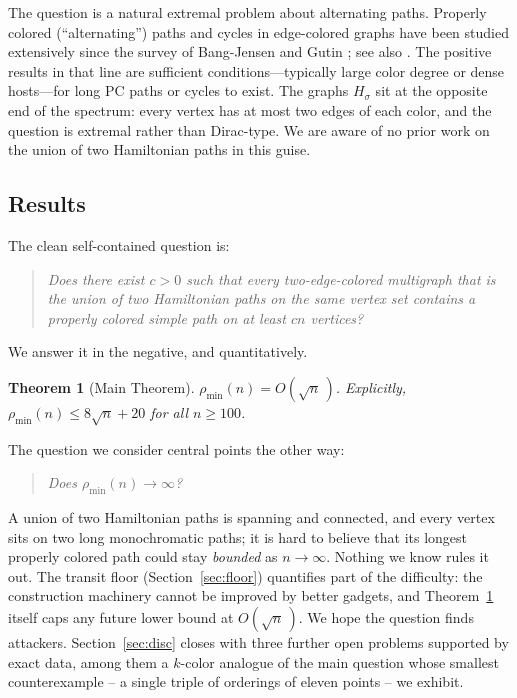 \documentclass[11pt]{article}
\newtheorem{theorem}{Theorem}[section]
\theoremstyle{definition}
\newcommand{\pmin}{\rho_{\min}}
\begin{document}
The question is a natural extremal problem about
alternating paths. Properly colored (``alternating'') paths and cycles in edge-colored
graphs have been studied extensively since the survey of Bang-Jensen and Gutin
\cite{BJG97}; see also \cite{GK09,ABMMM10}. The positive results in that line are
sufficient conditions---typically large color degree or dense hosts---for long PC paths
or cycles to exist. The graphs $H_\sigma$ sit at the opposite end of the spectrum:
every vertex has at most two edges of each color, and the question is extremal rather
than Dirac-type. We are aware of no prior work on the union of two Hamiltonian paths in
this guise.

\subsection{Results}

The clean self-contained question is:

\begin{quote}
\emph{Does there exist $c>0$ such that every two-edge-colored multigraph that is the
union of two Hamiltonian paths on the same vertex set contains a properly colored
simple path on at least $cn$ vertices?}
\end{quote}

We answer it in the negative, and quantitatively.

\begin{theorem}[Main Theorem]\label{thm:main-intro}
$\pmin(n) = O(\sqrt n\,)$. Explicitly, $\pmin(n) \le 8\sqrt n + 20$ for all
$n \ge 100$.
\end{theorem}

The question we consider central points the other way:

\begin{quote}
\emph{Does $\pmin(n) \to \infty$?}
\end{quote}

A union of two Hamiltonian paths is spanning and connected, and every vertex sits on
two long monochromatic paths; it is hard to believe that its longest properly colored
path could stay \emph{bounded} as $n \to \infty$. Nothing we know rules it out.
The transit floor (Section~\ref{sec:floor}) quantifies part of the difficulty:
the construction machinery cannot be improved by better gadgets, and
Theorem~\ref{thm:main-intro} itself caps any future lower bound at
$O(\sqrt n\,)$. We hope the question finds attackers.
Section~\ref{sec:disc} closes with three further open problems supported by
exact data, among them a $k$-color analogue of the main question whose smallest
counterexample -- a single triple of orderings of eleven points -- we exhibit.
\end{document}

